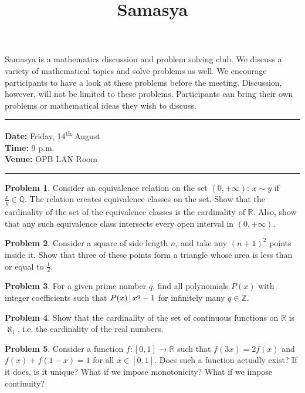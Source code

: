 \documentclass[10pt,a4paper,notitlepage]{article}
\title{\textrm{\textbf{\fontsize{30}{40}\selectfont Samasya}}}
\date{}
\theoremstyle{definition}
\newtheorem{prob}{Problem}
\newcommand{\divides}{\ensuremath{\nobreak \, \vert\, \nobreak}}
\begin{document}
\maketitle

Samasya is a mathematics discussion and problem solving club.
We discuss a variety of mathematical topics and solve problems as well.
We encourage participants to have a look at these problems%
before the meeting.
Discussion, however, will not be limited to these problems.
Participants can bring their own problems or mathematical ideas they wish to discuss.\\
\hrule

\textbf{Date:} Friday, 14\textsuperscript{th} August\\
\textbf{Time:} $9$ p.m.\\
\textbf{Venue:} OPB LAN Room\\
\hrule

\begin{prob}
    Consider an equivalence relation on the set $(0, +\infty)$: $x \sim y$ if $\frac{x}{y} \in \mathbb{Q}$. The relation creates equivalence classes on the set. Show that the cardinality of the set of the equivalence classes is the cardinality of $\mathbb{R}$. Also, show that any such equivalence class intersects every open interval in $(0, +\infty)$.
\end{prob}

\begin{prob}
    Consider a square of side length $n$, and take any $(n+1)^2$ points inside it. Show that three of these points form a triangle whose area is less than or equal to $\frac{1}{2}$.
\end{prob}

\begin{prob}
    For a given prime number $q$, find all polynomials $P(x)$ with integer coefficients such that \mbox{$P(x) \divides x^q - 1$} for infinitely many $q \in \mathbb{Z}$.
\end{prob}

\begin{prob}
    Show that the cardinality of the set of continuous functions on $\mathbb{R}$ is $\aleph_1$, i.e. the cardinality of the real numbers.
\end{prob}

\begin{prob}
    Consider a function $f: [0,1] \to \mathbb{R}$ such that $f(3x)=2f(x)$ and $f(x)+f(1-x)=1$ for all $x \in [0,1]$. Does such a function actually exist? If it does, is it unique? What if we impose monotonicity? What if we impose continuity?
\end{prob}
\end{document}
